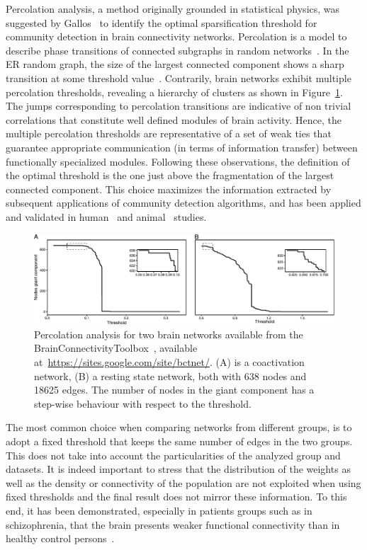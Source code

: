 Percolation analysis, a method originally grounded in statistical physics, was suggested by Gallos~\cite{gallos2012} to identify the optimal sparsification threshold for community detection in brain connectivity networks.
Percolation is a model to describe phase transitions of connected subgraphs in random networks~\cite{callaway2000,goerdt2001}.
In the ER random graph, the size of the largest connected component shows a sharp transition at some threshold value~\cite{callaway2000}.
Contrarily, brain networks exhibit multiple percolation thresholds, revealing a hierarchy of clusters as shown in Figure~\ref{fig:percolation_analysis_intro}.
The jumps corresponding to percolation transitions are indicative of non trivial correlations that constitute well defined modules of brain activity.
Hence, the multiple percolation thresholds are representative of a set of weak ties that guarantee appropriate communication (in terms of information transfer) between functionally specialized modules.
Following these observations, the definition of the optimal threshold is the one just above the fragmentation of the largest connected component.
This choice maximizes the information extracted by subsequent applications of community detection algorithms, and has been applied and validated in human~\cite{gallos2012} and animal~\cite{bardella2016a} studies.
\begin{figure}[htb!]
\centering
\includegraphics[width=1\linewidth]{images/percolation_analysis_side_by_side.pdf}
\caption{Percolation analysis for two brain networks available from the BrainConnectivityToolbox~\cite{rubinov2010}, available at~\url{https://sites.google.com/site/bctnet/}. (A) is a coactivation network, (B) a resting state network, both with 638 nodes and 18625 edges. The number of nodes in the giant component has a step-wise behaviour with respect to the threshold.}
\label{fig:percolation_analysis_intro}
\end{figure}

The most common choice when comparing networks from different groups, is to adopt a fixed threshold that keeps the same number of edges in the two groups.
This does not take into account the particularities of the analyzed group and datasets.
It is indeed important to stress that the distribution of the weights as well as the density or connectivity of the population are not exploited when using fixed thresholds and the final result does not mirror these information.
To this end, it has been demonstrated, especially in patients groups such as in schizophrenia, that the brain presents weaker functional connectivity than in healthy control persons~\cite{alexander-bloch2010}.


